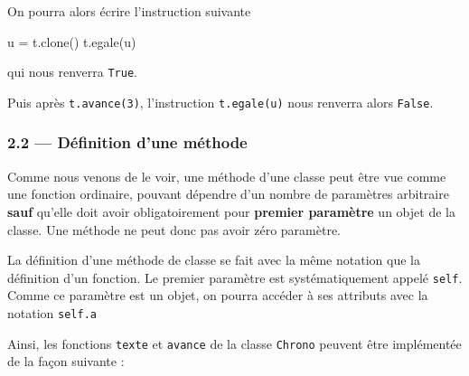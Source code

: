 \documentclass[a4paper,17pt]{extarticle}
\newenvironment{Shaded}{}{}
\newcommand{\NormalTok}[1]{{#1}}
\newcommand{\OperatorTok}[1]{\textcolor[rgb]{0.40,0.40,0.40}{{#1}}}
\begin{document}
On pourra alors écrire l'instruction suivante

\begin{Shaded}
\begin{Highlighting}[]
\NormalTok{u }\OperatorTok{=}\NormalTok{ t.clone()}
\NormalTok{t.egale(u)}
\end{Highlighting}
\end{Shaded}

qui nous renverra \texttt{True}.

Puis après \texttt{t.avance(3)}, l'instruction \texttt{t.egale(u)} nous
renverra alors \texttt{False}.

    \hypertarget{duxe9finition-dune-muxe9thode}{%
\subsubsection{2.2 --- Définition d'une
méthode}\label{duxe9finition-dune-muxe9thode}}

    Comme nous venons de le voir, une méthode d'une classe peut être vue
comme une fonction ordinaire, pouvant dépendre d'un nombre de paramètres
arbitraire \textbf{sauf} qu'elle doit avoir obligatoirement pour
\textbf{premier paramètre} un objet de la classe. Une méthode ne peut
donc pas avoir zéro paramètre.

La définition d'une méthode de classe se fait avec la même notation que
la définition d'un fonction. Le premier paramètre est systématiquement
appelé \texttt{self}. Comme ce paramètre est un objet, on pourra accéder
à ses attributs avec la notation \texttt{self.a}

    Ainsi, les fonctions \texttt{texte} et \texttt{avance} de la classe
\texttt{Chrono} peuvent être implémentée de la façon suivante :
\end{document}
